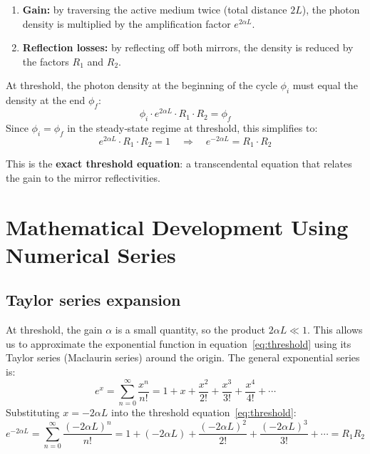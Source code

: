 \documentclass[12pt, a4paper]{article}
\begin{document}
\begin{enumerate}[leftmargin=2em]
  \item \textbf{Gain:} by traversing the active medium twice (total distance $2L$), the
        photon density is multiplied by the amplification factor $e^{2\alpha L}$.
  \item \textbf{Reflection losses:} by reflecting off both mirrors, the density is reduced
        by the factors $R_1$ and $R_2$.
\end{enumerate}

At threshold, the photon density at the beginning of the cycle $\phi_i$ must equal the
density at the end $\phi_f$:
%
\begin{equation}
  \phi_i \cdot e^{2\alpha L} \cdot R_1 \cdot R_2 = \phi_f
  \label{eq:threshold_full}
\end{equation}
%
Since $\phi_i = \phi_f$ in the steady‑state regime at threshold, this simplifies to:
%
\begin{equation}
  e^{2\alpha L} \cdot R_1 \cdot R_2 = 1
  \quad\Longrightarrow\quad
  e^{-2\alpha L} = R_1 \cdot R_2
  \label{eq:threshold}
\end{equation}

This is the \textbf{exact threshold equation}: a transcendental equation that relates the
gain to the mirror reflectivities.

\section{Mathematical Development Using Numerical Series}

\subsection{Taylor series expansion}

At threshold, the gain $\alpha$ is a small quantity, so the product $2\alpha L \ll 1$.
This allows us to approximate the exponential function in equation~\eqref{eq:threshold}
using its Taylor series (Maclaurin series) around the origin. The general exponential
series is:
%
\begin{equation}
  e^{x} = \sum_{n=0}^{\infty} \frac{x^n}{n!}
         = 1 + x + \frac{x^2}{2!} + \frac{x^3}{3!} + \frac{x^4}{4!} + \cdots
\end{equation}
%
Substituting $x = -2\alpha L$ into the threshold equation~\eqref{eq:threshold}:
%
\begin{equation}
  e^{-2\alpha L}
  = \sum_{n=0}^{\infty} \frac{(-2\alpha L)^n}{n!}
  = 1 + (-2\alpha L) + \frac{(-2\alpha L)^2}{2!} + \frac{(-2\alpha L)^3}{3!} + \cdots
  = R_1 R_2
  \label{eq:full_series}
\end{equation}
\end{document}
